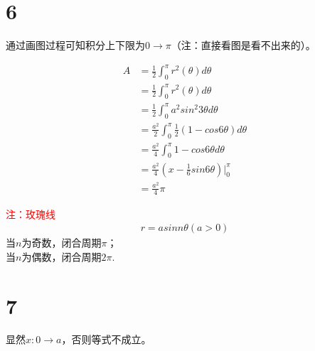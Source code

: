 \documentclass{article}
\begin{document}
\section*{6}


通过画图过程可知积分上下限为$0 \to \pi$（注：直接看图是看不出来的）。

\begin{align*}
  A & = \frac{1}{2} \int_{0}^{\pi} r^2(\theta) d \theta                    \\
    & = \frac{1}{2} \int_{0}^{\pi} r^2(\theta) d \theta                    \\
    & = \frac{1}{2} \int_{0}^{\pi} a^2sin^2 3\theta d \theta               \\
    & = \frac{a^2}{2} \int_{0}^{\pi} \frac{1}{2}(1 - cos 6\theta) d \theta \\
    & = \frac{a^2}{4} \int_{0}^{\pi} 1 - cos 6\theta d \theta              \\
    & = \frac{a^2}{4} (x - \frac{1}{6}sin 6 \theta)\bigg|_0^{\pi}          \\
    & = \frac{a^2}{4} \pi
\end{align*}

\textcolor{red}{注：玫瑰线}
\begin{align*}
  r = a sin n \theta (a > 0)
\end{align*}
当$n$为奇数，闭合周期$\pi$；\\
当$n$为偶数，闭合周期$2\pi$.

\section*{7}

显然$x: 0 \to a$，否则等式不成立。
\end{document}
